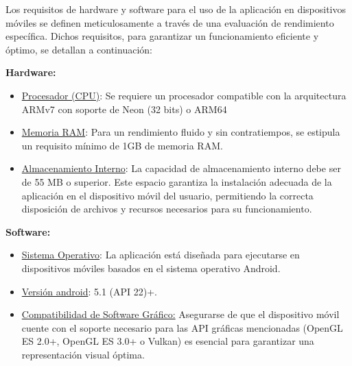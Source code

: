 Los requisitos de hardware y software para el uso de la aplicación en dispositivos móviles se definen meticulosamente a través de una evaluación de rendimiento específica. Dichos requisitos, para garantizar un funcionamiento eficiente y óptimo, se detallan a continuación:

\vspace{5pt}
\textbf{Hardware:}
\begin{itemize}
    \item \underline{Procesador (CPU)}: Se requiere un procesador compatible con la arquitectura ARMv7 con soporte de Neon (32 bits) o ARM64
    \item  \underline{Memoria RAM}: Para un rendimiento fluido y sin contratiempos, se estipula un requisito mínimo de 1GB de memoria RAM.  
    \item \underline{Almacenamiento Interno}: La capacidad de almacenamiento interno debe ser de 55 MB o superior. Este espacio garantiza la instalación adecuada de la aplicación en el dispositivo móvil del usuario, permitiendo la correcta disposición de archivos y recursos necesarios para su funcionamiento.   
\end{itemize}

\vspace{5pt}
\textbf{Software:}
\begin{itemize}
    \item \underline{Sistema Operativo}: La aplicación está diseñada para ejecutarse en dispositivos móviles basados en el sistema operativo Android.
    \item \underline{Versión android}: 5.1 (API 22)+.
    \item \underline{Compatibilidad de Software Gráfico:} Asegurarse de que el dispositivo móvil cuente con el soporte necesario para las API gráficas mencionadas (OpenGL ES 2.0+, OpenGL ES 3.0+ o Vulkan) es esencial para garantizar una representación visual óptima. 
\end{itemize} 